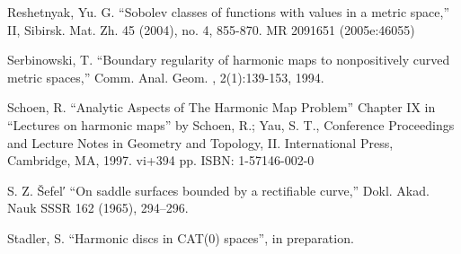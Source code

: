 \documentclass[a4paper,10pt]{amsart}
\begin{document}
\begin{thebibliography}{52}
Reshetnyak, Yu. G. ``Sobolev classes of functions with values in a metric space,'' II, Sibirsk. Mat. Zh. 45 (2004), no. 4, 855-870. MR 2091651 (2005e:46055)

 Serbinowski,  T. ``Boundary regularity of harmonic maps to nonpositively curved metric spaces,''
Comm. Anal. Geom. , 2(1):139-153, 1994.

Schoen, R. ``Analytic Aspects of The Harmonic Map Problem'' Chapter IX in  
``Lectures on harmonic maps'' by Schoen, R.; Yau, S. T.,  
Conference Proceedings and Lecture Notes in Geometry and Topology, II. International Press, Cambridge, MA, 1997. vi+394 pp. ISBN: 1-57146-002-0

 S. Z. \v{S}efel′ ``On saddle surfaces bounded by a rectifiable curve,'' Dokl. Akad. Nauk SSSR 162 (1965), 294--296.


 Stadler, S. ``Harmonic discs in CAT(0) spaces'', in preparation.



\end{thebibliography}
\end{document}
